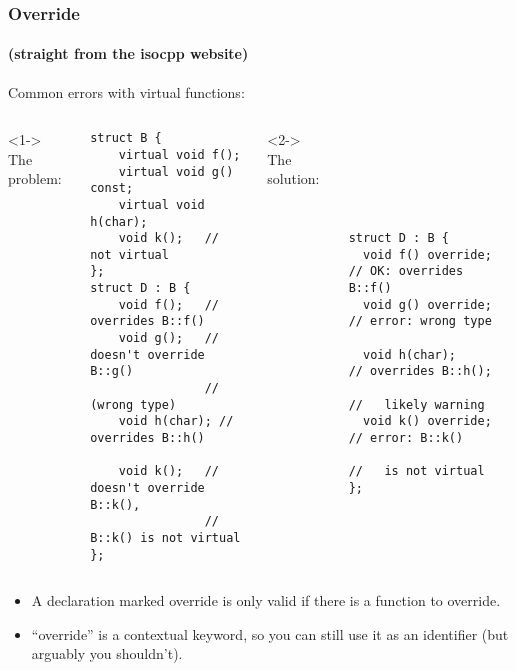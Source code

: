 \begin{frame}[fragile]
\frametitle{Override}
\framesubtitle{(straight from the isocpp website)}
Common errors with virtual functions:
\begin{columns}[t]
<1->
The problem:
{\scriptsize
\begin{verbatim}
struct B {
    virtual void f();
    virtual void g() const;
    virtual void h(char);
    void k();   // not virtual
};
struct D : B {
    void f();   // overrides B::f()
    void g();   // doesn't override B::g()
                //   (wrong type)
    void h(char); // overrides B::h()

    void k();   // doesn't override B::k(),
                // B::k() is not virtual
};
\end{verbatim}
}
\pause{}
<2->
The solution:
{\scriptsize
\begin{verbatim}






struct D : B {
  void f() override;  // OK: overrides B::f()
  void g() override;  // error: wrong type

  void h(char);       // overrides B::h();
                      //   likely warning
  void k() override;  // error: B::k()
                      //   is not virtual
};
\end{verbatim}
}
\end{columns}
\begin{itemize}
\item A declaration marked override is only valid if there is a function to override.
\item ``override'' is a contextual keyword, so you can still use it
  as an identifier (but arguably you shouldn't).
\end{itemize}
\begin{center}\end{center}
\end{frame}


